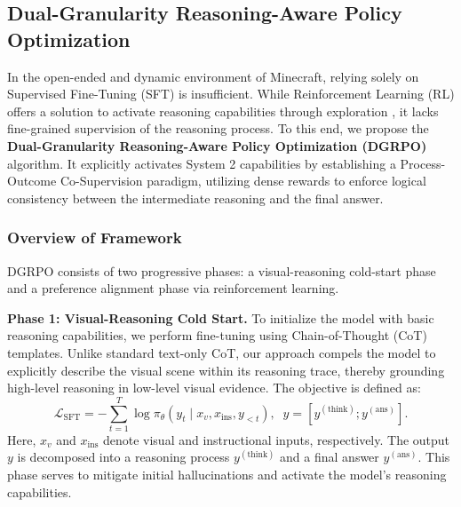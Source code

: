 

\subsection{Dual-Granularity Reasoning-Aware Policy Optimization}
\label{rl}



In the open-ended and dynamic environment of Minecraft, relying solely on Supervised Fine-Tuning (SFT) is insufficient. While Reinforcement Learning (RL) \cite{shao2024deepseekmath} offers a solution to activate reasoning capabilities through exploration \cite{guo2025deepseek}, it lacks fine-grained supervision of the reasoning process. To this end, we propose the \textbf{Dual-Granularity Reasoning-Aware Policy Optimization (DGRPO)} algorithm. It explicitly activates System 2 capabilities by establishing a Process-Outcome Co-Supervision paradigm, utilizing dense rewards to enforce logical consistency between the intermediate reasoning and the final answer.

\subsubsection{Overview of Framework}
DGRPO consists of two progressive phases: a visual-reasoning cold-start phase and a preference alignment phase via reinforcement learning.

\noindent\textbf{Phase 1: Visual-Reasoning Cold Start.}
To initialize the model with basic reasoning capabilities, we perform fine-tuning using Chain-of-Thought (CoT) \cite{wei2022chain} templates. Unlike standard text-only CoT, our approach compels the model to explicitly describe the visual scene within its reasoning trace, thereby grounding high-level reasoning in low-level visual evidence. The objective is defined as:
\begin{equation}
\mathcal{L}_{\text{SFT}} = - \sum_{t=1}^{T} \log \pi_{\theta} \left( y_t \mid x_v, x_{\text{ins}}, y_{<t} \right), \;\;y = [ y^{(\text{think})}; y^{(\text{ans})} ].
\end{equation}
Here, $x_v$ and $x_{\text{ins}}$ denote visual and instructional inputs, respectively. The output $y$ is decomposed into a reasoning process $y^{(\text{think})}$ and a final answer $y^{(\text{ans})}$. This phase serves to mitigate initial hallucinations and activate the model's reasoning capabilities.

